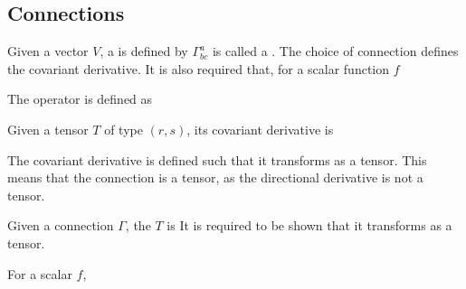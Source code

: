 \documentclass{article}
\begin{document}
\begin{lemma}
\end{lemma}

\begin{definition}
\end{definition}

\subsection{Connections}

\begin{definition}
Given a vector $V$, a  is defined by 
$\Gamma^a_{bc}$ is called a . The choice of connection defines the covariant derivative. It is also required that, for a scalar function $f$
\end{definition}

\begin{definition}[Laplacian]
The  operator is defined as 
\end{definition}

\begin{lemma}
Given a tensor $T$ of type $(r,s)$, its covariant derivative is 
\end{lemma}

\begin{idea}
The covariant derivative is defined such that it transforms as a tensor. This means that the connection is  a tensor, as the directional derivative is not a tensor. 
\end{idea}

\begin{definition}
Given a connection $\Gamma$, the  $T$ is 
It is required to be shown that it transforms as a tensor. 
\end{definition}

\begin{lemma}
For a scalar $f$,
\end{lemma}
\end{document}
